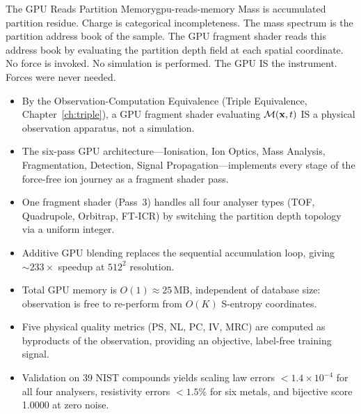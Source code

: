 \begin{consequence}{The GPU Reads Partition Memory}{gpu-reads-memory}
  Mass is accumulated partition residue.  Charge is categorical
  incompleteness.  The mass spectrum is the partition address book of the
  sample.  The GPU fragment shader reads this address book by evaluating
  the partition depth field at each spatial coordinate.  No force is
  invoked.  No simulation is performed.  The GPU IS the instrument.
  Forces were never needed.
\end{consequence}

\bigskip
\begin{tcolorbox}[colback=crownblue!5, colframe=crownblue!60!black,
                  title={\textbf{Chapter 22 Summary}}]
\begin{itemize}[noitemsep]
  \item By the Observation-Computation Equivalence (Triple Equivalence,
    Chapter~\ref{ch:triple}), a GPU fragment shader evaluating
    $\mathcal{M}(\mathbf{x},t)$ IS a physical observation apparatus, not a
    simulation.
  \item The six-pass GPU architecture---Ionisation, Ion Optics, Mass Analysis,
    Fragmentation, Detection, Signal Propagation---implements every stage of
    the force-free ion journey as a fragment shader pass.
  \item One fragment shader (Pass~3) handles all four analyser types (TOF,
    Quadrupole, Orbitrap, FT-ICR) by switching the partition depth topology
    via a uniform integer.
  \item Additive GPU blending replaces the sequential accumulation loop,
    giving ${\sim}233\times$ speedup at $512^2$ resolution.
  \item Total GPU memory is $O(1) \approx 25\,\mathrm{MB}$, independent of
    database size: observation is free to re-perform from $O(K)$ S-entropy
    coordinates.
  \item Five physical quality metrics (PS, NL, PC, IV, MRC) are computed as
    byproducts of the observation, providing an objective, label-free training
    signal.
  \item Validation on 39 NIST compounds yields scaling law errors $<
    1.4\times 10^{-4}$ for all four analysers, resistivity errors $< 1.5\%$
    for six metals, and bijective score 1.0000 at zero noise.
\end{itemize}
\end{tcolorbox}
